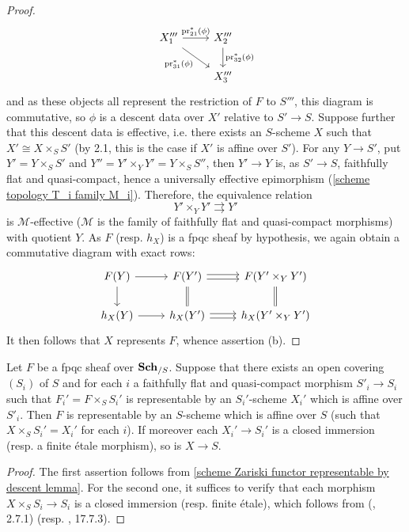\begin{proof}
\[\begin{tikzcd}
X_1'''\ar[rd,swap,"\pr_{31}^*(\phi)"]\ar[r,"\pr_{21}^*(\phi)"]&X_2'''\ar[d,"\pr_{32}^*(\phi)"]\\
&X_3'''
\end{tikzcd}\]
and as these objects all represent the restriction of $F$ to $S'''$, this diagram is commutative, so $\phi$ is a descent data over $X'$ relative to $S'\to S$. Suppose further that this descent data is effective, i.e. there exists an $S$-scheme $X$ such that $X'\cong X\times_SS'$ (by \cite{SGA1}  2.1, this is the case if $X'$ is affine over $S'$). For any $Y\to S'$, put $Y'=Y\times_SS'$ and $Y''=Y'\times_YY'=Y\times_SS''$, then $Y'\to Y$ is, as $S'\to S$, faithfully flat and quasi-compact, hence a universally effective epimorphism (\cref{scheme topology T_i family M_i}). Therefore, the equivalence relation
\[Y'\times_YY'\rightrightarrows Y'\]
is $\mathcal{M}$-effective ($\mathcal{M}$ is the family of faithfully flat and quasi-compact morphisms) with quotient $Y$. As $F$ (resp. $h_X$) is a fpqc sheaf by hypothesis, we again obtain a commutative diagram with exact rows:
\[\begin{tikzcd}
F(Y)\ar[r]\ar[d]&F(Y')\ar[r,shift left=2pt]\ar[r,shift right=2pt]\ar[d,equal]&F(Y'\times_YY')\ar[d,equal]\\
h_X(Y)\ar[r]&h_X(Y')\ar[r,shift left=2pt]\ar[r,shift right=2pt]&h_X(Y'\times_YY')
\end{tikzcd}\]
It then follows that $X$ represents $F$, whence assertion (b).
\end{proof}

\begin{corollary}\label{scheme fpqc functor representable by descent}
Let $F$ be a fpqc sheaf over $\mathbf{Sch}_{/S}$. Suppose that there exists an open covering $(S_i)$ of $S$ and for each $i$ a faithfully flat and quasi-compact morphism $S'_i\to S_i$ such that $F_i'=F\times_SS_i'$ is representable by an $S_i'$-scheme $X_i'$ which is affine over $S'_i$. Then $F$ is representable by an $S$-scheme which is affine over $S$ (such that $X\times_SS_i'=X_i'$ for each $i$). If moreover each $X_i'\to S_i'$ is a closed immersion (resp. a finite \'etale morphism), so is $X\to S$.
\end{corollary}
\begin{proof}
The first assertion follows from \cref{scheme Zariski functor representable by descent lemma}. For the second one, it suffices to verify that each morphism $X\times_SS_i\to S_i$ is a closed immersion (resp. finite \'etale), which follows from (\cite{EGA4-2}, 2.7.1) (resp. \cite{EGA4-4}, 17.7.3).
\end{proof}

